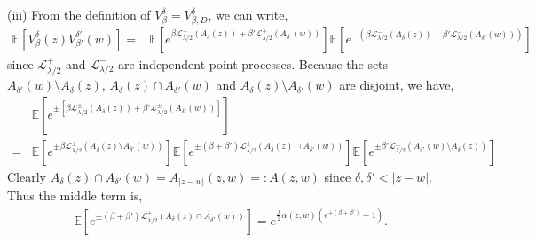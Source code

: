 \documentclass[a4paper, 11pt, reqno]{amsart}
\theoremstyle{definition} \newtheorem{defn}{Definition}[section]
\theoremstyle{remark} \newtheorem{rem}[defn]{Remark}
\theoremstyle{remark} \newtheorem*{rem*}{Remark}
\theoremstyle{plain} \newtheorem{thm}[defn]{Theorem}
\theoremstyle{plain} \newtheorem{lem}[defn]{Lemma}
\theoremstyle{plain} \newtheorem{prop}[defn]{Proposition}
\theoremstyle{plain} \newtheorem{cor}[defn]{Corollary}
\theoremstyle{remark} \newtheorem{exm}[defn]{\textbf{Example}}
\theoremstyle{remark} \newtheorem{exms}[defn]{\textbf{Examples}}
\theoremstyle{remark} \newtheorem*{bl}{}
\numberwithin{equation}{section} %
\newcommand{\mc}{\mathcal}
\newcommand{\E}{\mathbb{E}}
\begin{document}
		(iii) From the definition of $V^{\delta}_{\beta} = V^{\delta}_{\beta, D}$, we can write,
		\begin{align}\label{eq:2point_1}
			 \E \left[ V^{\delta}_{\beta}(z) V^{\delta'}_{\beta'}(w)\right] 
            = & \E \left[ e^{\beta \mc{L}_{\lambda/2}^+(A_{\delta}(z))  +  \beta' \mc{L}_{\lambda/2}^+(A_{\delta'}(w)) } \right] 
            \E \left[ e^{- (\beta \mc{L}_{\lambda/2}^-(A_{\delta}(z))  +  \beta' \mc{L}_{\lambda/2}^-(A_{\delta'}(w))) } \right]
		\end{align}
        since $\mc{L}_{\lambda/2}^+$ and $\mc{L}_{\lambda/2}^-$ are independent point processes. Because the sets $A_{\delta'} (w)\setminus A_{\delta}(z)$, $A_{\delta}(z)\cap A_{\delta'}(w)$ and $A_{\delta}(z)\setminus A_{\delta'} (w)$ are disjoint, we have,   
        \begin{align}\label{eq:2point_2}
			& \E \left[ e^{\pm[ \beta \mc{L}_{\lambda/2}^{\pm}(A_{\delta}(z))  +  \beta' \mc{L}_{\lambda/2}^{\pm}(A_{\delta'}(w))] } \right] 
            \nonumber \\
			= & \E \left[e^{ \pm\beta  \mc{L}_{\lambda/2}^{\pm}( A_{\delta}(z)\setminus A_{\delta'} (w) )}\right] \E \left[e^{ \pm(\beta+\beta')  \mc{L}_{\lambda/2}^{\pm}(A_{\delta}(z)\cap A_{\delta'} (w))}\right] \E \left[e^ {\pm\beta'  \mc{L}_{\lambda/2}^{\pm}(A_{\delta'} (w)\setminus A_{\delta}(z))} \right]
		\end{align}		
		Clearly $A_{\delta}(z)\cap A_{\delta'}(w) = A_{|z-w|}(z,w) = : A(z,w)$ since $\delta, \delta'<|z-w|$. Thus the middle term is,
        \begin{align}\label{eq:2point_2.1}
            \E \left[e^{ \pm (\beta+\beta')  \mc{L}_{\lambda/2}^{\pm}(A_{\delta}(z)\cap A_{\delta'} (w))}\right]  = e^{\frac{\lambda}{2}\alpha(z,w) \left(e^{\pm (\beta+\beta')}-1\right)}.
        \end{align}
\end{document}
